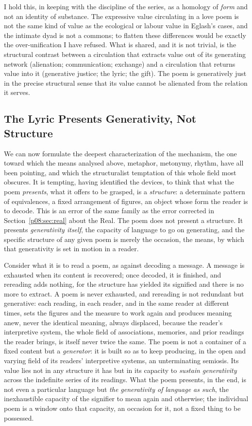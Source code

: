 I hold this, in keeping with the discipline of the series, as a homology of \emph{form} and not an identity of substance. The expressive value circulating in a love poem is not the same kind of value as the ecological or labour value in Eglash's cases, and the intimate dyad is not a commons; to flatten these differences would be exactly the over-unification I have refused. What is shared, and it is not trivial, is the structural contrast between a circulation that extracts value out of its generating network (alienation; communication; exchange) and a circulation that returns value into it (generative justice; the lyric; the gift). The poem is generatively just in the precise structural sense that its value cannot be alienated from the relation it serves.

\subsection{The Lyric Presents Generativity, Not Structure}\label{p08:sec:generativity}

We can now formulate the deepest characterization of the mechanism, the one toward which the means analysed above, metaphor, metonymy, rhythm, have all been pointing, and which the structuralist temptation of this whole field most obscures. It is tempting, having identified the devices, to think that what the poem \emph{presents}, what it offers to be grasped, is a \emph{structure}: a determinate pattern of equivalences, a fixed arrangement of figures, an object whose form the reader is to decode. This is an error of the same family as the error corrected in Section~\ref{p08:sec:real} about the Real. The poem does not present a structure. It presents \emph{generativity itself}, the capacity of language to go on generating, and the specific structure of any given poem is merely the occasion, the means, by which that generativity is set in motion in a reader.

Consider what it is to read a poem, as against decoding a message. A message is exhausted when its content is recovered; once decoded, it is finished, and rereading adds nothing, for the structure has yielded its signified and there is no more to extract. A poem is never exhausted, and rereading is not redundant but generative: each reading, in each reader, and in the same reader at different times, sets the figures and the measure to work again and produces meaning anew, never the identical meaning, always displaced, because the reader's interpretive system, the whole field of associations, memories, and prior readings the reader brings, is itself never twice the same. The poem is not a container of a fixed content but a \emph{generator}: it is built so as to keep producing, in the open and varying field of its readers' interpretive systems, an unterminating semiosis. Its value lies not in any structure it has but in its capacity to \emph{sustain generativity} across the indefinite series of its readings. What the poem presents, in the end, is not even a particular language but \emph{the generativity of language as such}, the inexhaustible capacity of the signifier to mean again and otherwise; the individual poem is a window onto that capacity, an occasion for it, not a fixed thing to be possessed.

